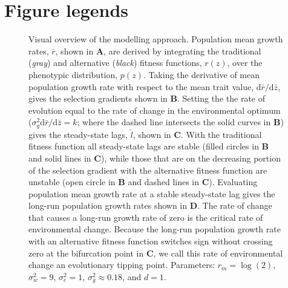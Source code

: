 \documentclass[12pt,letterpaper]{article} %
\begin{document}
\newpage


\newpage
\section*{Figure legends}
\doublespacing

\begin{figure}[!ht]
\centering
\caption{
Visual overview of the modelling approach. 
Population mean growth rates, $\bar{r}$, shown in \textbf{A}, are derived by integrating the traditional (\textit{gray}) and alternative (\textit{black}) fitness functions, $r(z)$, over the phenotypic distribution, $p(z)$.
Taking the derivative of mean population growth rate with respect to the mean trait value, $\mathrm{d}\bar{r}/\mathrm{d}\bar{z}$, gives the selection gradients shown in \textbf{B}.
Setting the the rate of evolution equal to the rate of change in the environmental optimum ($\sigma_g^2\mathrm{d}\bar{r}/\mathrm{d}\bar{z} = k$; where the dashed line intersects the solid curves in \textbf{B}) gives the steady-state lags, $\hat{l}$, shown in \textbf{C}.
With the traditional fitness function all steady-state lags are stable (filled circles in \textbf{B} and solid lines in \textbf{C}), while those that are on the decreasing portion of the selection gradient with the alternative fitness function are unstable (open circle in \textbf{B} and dashed lines in \textbf{C}). 
Evaluating population mean growth rate at a stable steady-state lag gives the long-run population growth rates shown in \textbf{D}.
The rate of change that causes a long-run growth rate of zero is the critical rate of environmental change.
Because the long-run population growth rate with an alternative fitness function switches sign without crossing zero at the bifurcation point in \textbf{C}, we call this rate of environmental change an evolutionary tipping point.  
Parameters: $r_m = \log(2)$, $\sigma_w^2 = 9$, $\sigma_e^2 = 1$, $\sigma_g^2\approx0.18$, and $d=1$.
}
\label{SSGrowth}
\end{figure}
\end{document}

